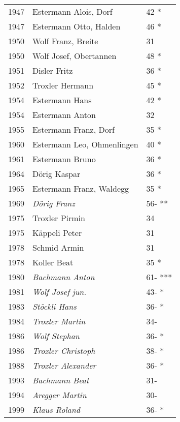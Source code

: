 {\begin{longtable}{ l l l }
        1947          & Estermann Alois, Dorf         & 42 *        \\
        1947          & Estermann Otto,  Halden       & 46 *        \\
        1950          & Wolf Franz, Breite            & 31          \\
        1950          & Wolf Josef, Obertannen        & 48 *        \\
        1951          & Disler Fritz                  & 36 *        \\
        1952          & Troxler Hermann               & 45 *        \\
        1954          & Estermann Hans                & 42 *        \\
        1954          & Estermann Anton               & 32          \\
        1955          & Estermann Franz, Dorf         & 35 *        \\
        1960          & Estermann Leo, Ohmenlingen    & 40 *        \\
        1961          & Estermann Bruno               & 36 *        \\
        1964          & Dörig Kaspar                  & 36 *        \\
        1965          & Estermann Franz, Waldegg      & 35 *        \\
        1969          & \emph{Dörig Franz}            & 56- **      \\
        1975          & Troxler Pirmin                & 34          \\
        1975          & Käppeli Peter                 & 31          \\
        1978          & Schmid Armin                  & 31          \\
        1978          & Koller Beat                   & 35 *        \\
        1980          & \emph{Bachmann Anton}         & 61- ***     \\
        1981          & \emph{Wolf Josef jun.}        & 43- *       \\
        1983          & \emph{Stöckli Hans}           & 36- *       \\
        1984          & \emph{Troxler Martin}         & 34-         \\
        1986          & \emph{Wolf Stephan}           & 36- *       \\
        1986          & \emph{Troxler Christoph}      & 38- *       \\
        1988          & \emph{Troxler Alexander}      & 36- *       \\
        1993          & \emph{Bachmann Beat}          & 31-         \\
        1994          & \emph{Aregger Martin}         & 30-         \\
        1999          & \emph{Klaus Roland}           & 36- *       \\
    \end{longtable}
    \unskip
    \unpenalty
    \unpenalty}

